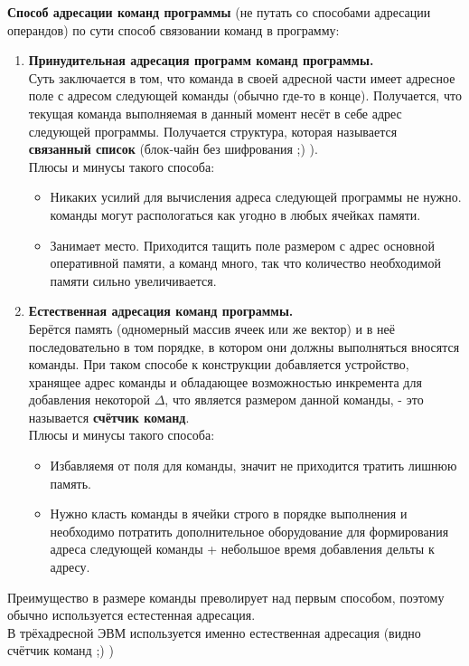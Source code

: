 \documentclass[12px]{article}
\begin{document}
\begin{enumerate}
\begin{enumerate}
		\textbf{Способ адресации команд программы} (не путать со способами адресации операндов) по сути способ связовании команд в программу: 
		\begin{enumerate}
			\item \textbf{Принудительная адресация программ команд программы.} \\
				Суть заключается в том, что команда в своей адресной части имеет адресное поле с адресом следующей команды (обычно где-то в конце). Получается, что текущая команда выполняемая в данный момент несёт в себе адрес следующей программы. Получается структура, которая называется \textbf{связанный список} (блок-чайн без шифрования ;) ).\\ 
				Плюсы и минусы такого способа:
				\begin{itemize}
					\item Никаких усилий для вычисления адреса следующей программы не нужно. команды могут распологаться как угодно в любых ячейках памяти. 
					\item Занимает место. Приходится тащить поле размером с адрес основной оперативной памяти, а команд много, так что количество необходимой памяти сильно увеличивается. 
				\end{itemize}
		\item \textbf{Естественная адресация команд программы.} \\
			Берётся память (одномерный массив ячеек или же вектор) и в неё последовательно в том порядке, в котором они должны выполняться вносятся команды. При таком способе к конструкции добавляется устройство, хранящее адрес команды и обладающее возможностью инкремента для добавления некоторой $\Delta$, что является размером данной команды, - это называется \textbf{счётчик команд}. \\
			Плюсы и минусы такого способа:
			\begin{itemize}
				\item Избавляемя от поля для команды, значит не приходится тратить лишнюю память.
			\item Нужно класть команды в ячейки строго в порядке выполнения и необходимо потратить дополнительное оборудование для формирования адреса следующей команды + небольшое время добавления дельты к адресу. 
			\end{itemize}
		\end{enumerate}
		Преимущество в размере команды преволирует над первым способом, поэтому обычно используется естестенная адресация. \\
		В трёхадресной ЭВМ используется именно естественная адресация (видно счётчик команд ;) )\\


\end{enumerate}
\end{enumerate}
\end{document}
